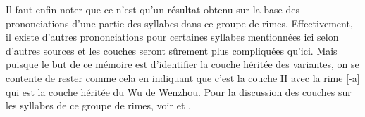 \documentclass{scrbook}
\newcounter{c}[subsubsection]
\begin{document}
\begin{sloppypar}
\begin{table}[htbp]
  \centering
{}%
  \caption{Couches sur les syllabes de 果攝 du Wu de Wenzhou}
  \label{tab:exemple_couches_guo_wenzhou}%
\end{table}%

Il faut enfin noter que ce n'est qu'un résultat obtenu sur la base des prononciations d'une partie des syllabes dans ce groupe de rimes. Effectivement, il existe d'autres prononciations pour certaines syllabes mentionnées ici selon d'autres sources et les couches seront sûrement plus compliquées qu'ici. Mais puisque le but de ce mémoire est d'identifier la couche héritée des variantes, on se contente de rester comme cela en indiquant que c'est la couche II avec la rime [-a] qui est la couche héritée du Wu de Wenzhou. Pour la discussion des couches sur les syllabes de ce groupe de rimes, voir \textcite{Zhengzhang1983wenzhou_guo} et \textcite{Sun2017nanwu_guo}.


\end{sloppypar}
\end{document}
